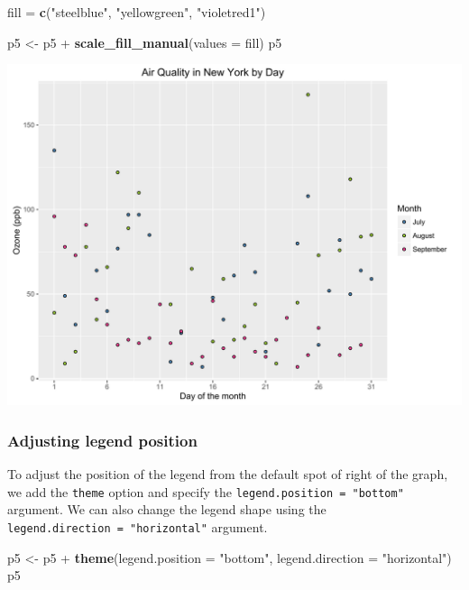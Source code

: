 \documentclass[]{article}
\newenvironment{Shaded}{\begin{snugshade}}{\end{snugshade}}
\newcommand{\KeywordTok}[1]{\textcolor[rgb]{0.13,0.29,0.53}{\textbf{{#1}}}}
\newcommand{\DataTypeTok}[1]{\textcolor[rgb]{0.13,0.29,0.53}{{#1}}}
\newcommand{\StringTok}[1]{\textcolor[rgb]{0.31,0.60,0.02}{{#1}}}
\newcommand{\NormalTok}[1]{{#1}}
\begin{document}
\begin{Shaded}
\begin{Highlighting}[]
\NormalTok{fill =}\StringTok{ }\KeywordTok{c}\NormalTok{(}\StringTok{"steelblue"}\NormalTok{, }\StringTok{"yellowgreen"}\NormalTok{, }\StringTok{"violetred1"}\NormalTok{)}

\NormalTok{p5 <-}\StringTok{ }\NormalTok{p5 +}\StringTok{ }\KeywordTok{scale_fill_manual}\NormalTok{(}\DataTypeTok{values =} \NormalTok{fill)}
\NormalTok{p5}
\end{Highlighting}
\end{Shaded}

\begin{center}\includegraphics{0_all_posts_pdf/scatter_10-1} \end{center}

\subsubsection{Adjusting legend
position}\label{adjusting-legend-position-3}

To adjust the position of the legend from the default spot of right of
the graph, we add the \texttt{theme} option and specify the
\texttt{legend.position\ =\ "bottom"} argument. We can also change the
legend shape using the \texttt{legend.direction\ =\ "horizontal"}
argument.

\begin{Shaded}
\begin{Highlighting}[]
\NormalTok{p5 <-}\StringTok{ }\NormalTok{p5 +}\StringTok{ }\KeywordTok{theme}\NormalTok{(}\DataTypeTok{legend.position =} \StringTok{"bottom"}\NormalTok{, }\DataTypeTok{legend.direction =} \StringTok{"horizontal"}\NormalTok{)}
\NormalTok{p5}
\end{Highlighting}
\end{Shaded}
\end{document}
